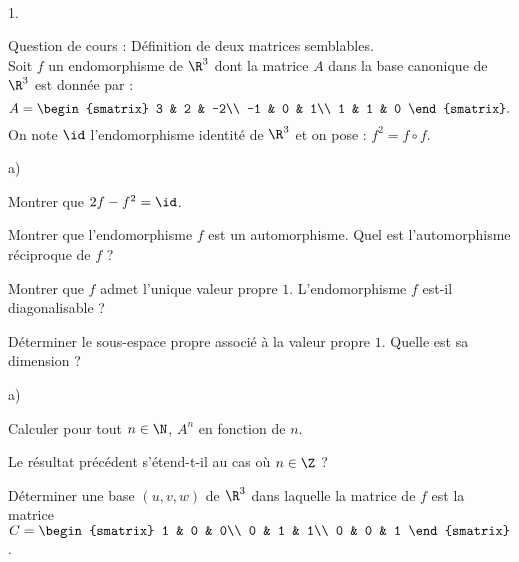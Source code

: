 \documentclass[11pt]{article}%
\begin{document}
\begin{exerciceAP}~
  \begin{noliste}{1.}
    \setlength{\itemsep}{2mm}
  \item Question de cours : Définition de deux matrices semblables.\\
    Soit $f$ un endomorphisme de $\R^3$ dont la matrice $A$ dans la
    base canonique de $\R^3$ est donnée par :
    \[
    A = 
    \begin{smatrix} 
      3 & 2 & -2\\ 
      -1 & 0 & 1\\ 
      1 & 1 & 0
    \end{smatrix}.
    \]
    On note $\id$ l'endomorphisme identité de $\R^3$ et on pose :
    $f^2=f\circ f$.
  \item
    \begin{noliste}{a)}
    \setlength{\itemsep}{2mm}
    \item Montrer que $2f-f^2=\id$.
    \item Montrer que l'endomorphisme $f$ est un automorphisme. Quel
      est l'automorphisme réciproque de $f$ ?
    \item Montrer que $f$ admet l'unique valeur propre
      $1$. L'endomorphisme $f$ est-il diagonalisable ?
    \item Déterminer le sous-espace propre associé à la valeur propre
      $1$. Quelle est sa dimension ?
    \end{noliste}

  \item
    \begin{noliste}{a)}
    \setlength{\itemsep}{2mm}
    \item Calculer pour tout $n\in\N$, $A^n$ en fonction de $n$.
    \item Le résultat précédent s'étend-t-il au cas où $n\in\Z$ ?
    \end{noliste}

  \item Déterminer une base $(u,v,w)$ de $\R^3$ dans laquelle la
    matrice de $f$ est la matrice $C = 
    \begin{smatrix} 
      1 & 0 & 0\\
      0 & 1 & 1\\ 
      0 & 0 & 1
    \end{smatrix}$.
  \end{noliste}
\end{exerciceAP}

\end{document}
